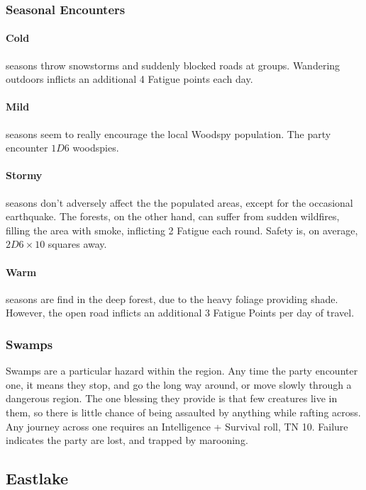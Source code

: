 \begin{multicols}{2}
\subsubsection{Seasonal Encounters}

\paragraph{Cold} seasons throw snowstorms and suddenly blocked roads at groups.
Wandering outdoors inflicts an additional 4 Fatigue points each day.
\paragraph{Mild} seasons seem to really encourage the local Woodspy population.
The party encounter $1D6$ woodspies.
\paragraph{Stormy} seasons don't adversely affect the the populated areas, except for the occasional earthquake.
The forests, on the other hand, can suffer from sudden wildfires, filling the area with smoke, inflicting 2 Fatigue each round.
Safety is, on average, $2D6 \times 10$ squares away.
\paragraph{Warm} seasons are find in the deep forest, due to the heavy foliage providing shade.
However, the open road inflicts an additional 3 Fatigue Points per day of travel.

\subsubsection{Swamps}

Swamps are a particular hazard within the region.
Any time the party encounter one, it means they stop, and go the long way around, or move slowly through a dangerous region.
The one blessing they provide is that few creatures live in them, so there is little chance of being assaulted by anything while rafting across.
Any journey across one requires an Intelligence + Survival roll, TN 10.
Failure indicates the party are lost, and trapped by marooning.

\subsection{Eastlake}


\end{multicols}
